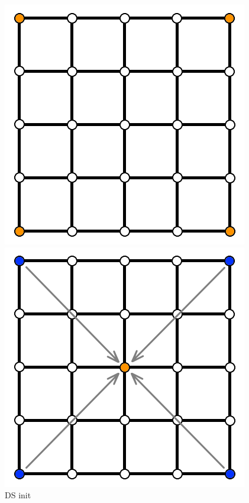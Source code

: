 \documentclass[11pt,a4paper,twoside,openright]{report}
\begin{document}
\begin{figure}[!htb]
  \includegraphics[width=\linewidth]{ds1.png}
  \caption{DS init}\label{fig:ds1}
\endminipage
{}
  \includegraphics[width=\linewidth]{ds2.png}

\end{figure}
\end{document}
